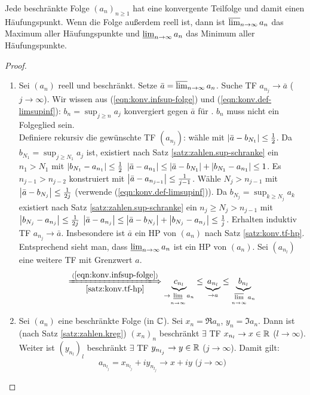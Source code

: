 \documentclass[12pt]{scrreprt}
\begin{document}
\begin{thm}
\label{thm:konv.bw}
Jede beschränkte Folge $(a_n)_{n\ge1}$ hat eine konvergente Teilfolge und damit einen Häufungspunkt. Wenn die Folge außerdem reell ist, dann ist $\varlimsup_{n\rightarrow\infty}{a_n}$ das Maximum aller Häufungspunkte und $\varliminf_{n\rightarrow\infty}{a_n}$ das Minimum aller Häufungspunkte.
\end{thm}
\begin{proof}
\begin{enumerate}
\item Sei $(a_n)$ reell und beschränkt. Setze $\bar{a} = \varlimsup_{n\rightarrow\infty}{a_n}$. Suche TF $a_{n_j}\to\bar{a}$ ($j\to\infty$). Wir wissen aus (\ref{eqn:konv.infsup-folge}) und (\ref{eqn:konv.def-limsupinf}): $b_n=\sup_{j\ge n}{a_j}$ konvergiert gegen $\bar{a}$ für \ninf. $b_n$ muss nicht ein Folgeglied sein.\\
Definiere rekursiv die gewünschte TF $(a_{n_j})$: wähle  mit $\left\lvert\bar{a}-b_{N_1}\right\lvert\le\frac12$. Da $b_{N_1} = \sup_{j\ge N_1}{a_j}$ ist, existiert nach Satz \ref{satz:zahlen.sup-schranke} ein $n_1>N_1$ mit $\left\lvert b_{N_1}-a_{n_1}\right\lvert\le\frac12$ \folgt $\left\lvert\bar{a}-a_{n_1}\right\lvert \le \left\lvert\bar{a}-b_{N_1}\right\lvert + \left\lvert b_{N_1}-a_{n_1}\right\lvert \le 1$. Es $n_{j-1}>n_{j-2}$ konstruiert mit $\left\lvert\bar{a}-a_{n_{j-1}}\right\lvert\le\frac{1}{j-1}$. Wähle $N_j>n_{j-1}$ mit $\left\lvert\bar{a}-b_{N_j}\right\lvert\le\frac{1}{2j}$ (verwende (\ref{eqn:konv.def-limsupinf})). Da $b_{N_j} = \sup_{k\ge N_j}{a_k}$ existiert nach Satz \ref{satz:zahlen.sup-schranke} ein $n_j\ge N_j>n_{j-1}$ mit $\left\lvert b_{N_j}-a_{n_j}\right\lvert\le\frac{1}{2j}$ \folgt $\left\lvert\bar{a}-a_{n_j}\right\lvert \le \left\lvert\bar{a}-b_{N_j}\right\lvert + \left\lvert b_{N_j}-a_{n_j}\right\lvert \le \frac1j$. Erhalten induktiv TF $a_{n_j}\to\bar{a}$. Insbesondere ist $\bar{a}$ ein HP von $(a_n)$ nach Satz \ref{satz:konv.tf-hp}. Entsprechend sieht man, dass $\varliminf_{n\rightarrow\infty}{a_n}$ ist ein HP von $(a_n)$. Sei $(a_{n_l})$ eine weitere TF mit Grenzwert $a$.
\[\xLongrightarrow[\ref{satz:konv.tf-hp}]{(\ref{eqn:konv.infsup-folge})} \underbrace{c_{n_l}}_{\to\li\limits_{\ninf}{a_n}} \le \underbrace{a_{n_l}}_{\to a} \le \underbrace{b_{n_l}}_{\ls\limits_{\ninf}{a_n}}\]
\item Sei $(a_n)$ eine beschränkte Folge (in $\mathbb{C}$). Sei $x_n=\Re{a_n}$, $y_n=\Im{a_n}$. Dann ist (nach Satz \ref{satz:zahlen.kreg}) $(x_n)_n$ beschränkt  $\exists$ TF $x_{n_l}\to x\in\mathbb{R}$ ($l\to\infty$). Weiter ist $(y_{n_l})_l$ beschränkt  $\exists$ TF $y_{n_{l_j}}\to y\in\mathbb{R}$ ($j\to\infty$). Damit gilt:
\[a_{n_{l_j}} = x_{n_{l_j}} + iy_{n_{l_j}} \to x+iy \text{ (} j\to\infty \text{)}\]
\end{enumerate}
\end{proof}
\end{document}
